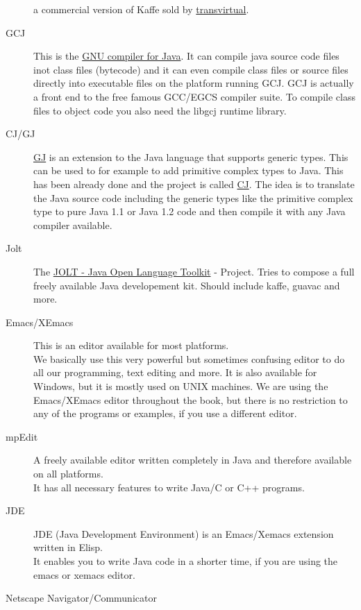 \begin{description}
  a commercial version of Kaffe sold by 
  \href{http://www.transvirtual.com}{transvirtual}.
\item[GCJ]  This is the 
  \href{http://sourceware.cygnus.com/java/gcj.html}{GNU compiler for Java}. 
  It can compile java
  source code files inot class files (bytecode) and it can even
  compile class files or source files directly into executable
  files on the platform running GCJ. GCJ is actually a front end
  to the free famous GCC/EGCS compiler suite. To compile class files
  to object code you also need the libgcj runtime library.
\item[CJ/GJ]  
  \href{http://wwwipd.ira.uka.de/~pizza/gj/}{GJ}
  is an extension to the Java language that supports
  generic types. This can be used to for example to add primitive
  complex types to Java. This has been already done and the project
  is called \href{http://wwwipd.ira.uka.de/~gunthner}{CJ}. 
  The idea is to translate the Java source code including
  the generic types like the primitive complex type to pure Java 1.1
  or Java 1.2 code and then compile it with any Java compiler available.
\item[Jolt] The \href{http://www.redhat.com/}
  {JOLT - Java Open Language Toolkit} - Project. Tries to
  compose a full freely available Java developement kit. Should
  include kaffe, guavac and more.
\item[Emacs/XEmacs] 
  This is an editor available for most platforms.\\
  We basically use this very powerful but sometimes confusing
  editor to do all our programming, text editing and more. It is
  also available for Windows, but it is mostly used on UNIX machines.
  We are using the Emacs/XEmacs editor throughout the book, but 
  there is no restriction to any of the programs or examples, if
  you use a different editor.
\item[mpEdit]  A freely available editor written completely in Java and
  therefore available on all platforms.\\ 
  It has all necessary features to write Java/C or C++ programs.
\item[JDE]  JDE (Java Development Environment) is an Emacs/Xemacs 
  extension
  written in Elisp. \\
  It enables you to write Java code in a shorter time, if you are
  using the emacs or xemacs editor. 
\item[Netscape Navigator/Communicator] 

\end{description}
